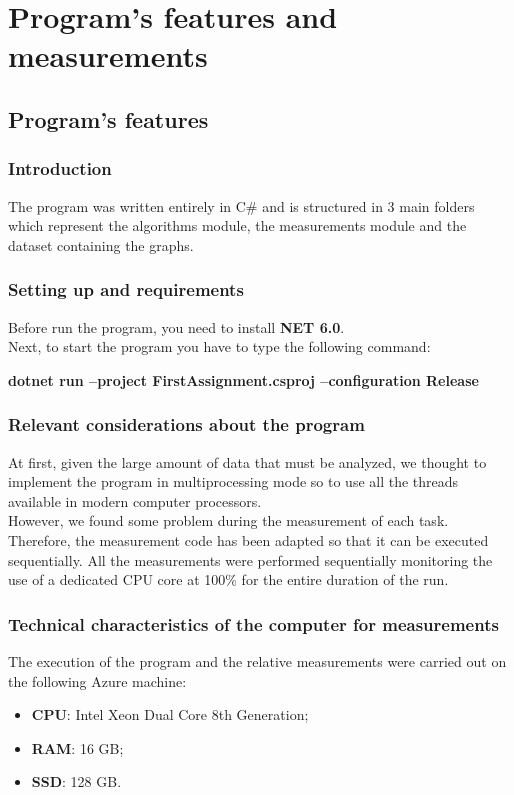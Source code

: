 \section{Program's features and measurements}

\subsection{Program's features}

\subsubsection{Introduction}
The program was written entirely in C\# and is structured in 3 main folders which represent the algorithms module, the measurements module and the dataset containing the graphs.

\subsubsection{Setting up and requirements}
Before run the program, you need to install \textbf{NET 6.0}.\\
Next, to start the program you have to type the following command:\\
\centerline{\textbf{dotnet run --project FirstAssignment.csproj --configuration Release}}

\subsubsection{Relevant considerations about the program}
At first, given the large amount of data that must be analyzed, we thought to implement the program in multiprocessing mode so to use all the threads available in modern computer processors. \\
\noindent
However, we found some problem during the measurement of each task.
Therefore, the measurement code has been adapted so that it can be executed sequentially.
All the measurements were performed sequentially monitoring the use of a dedicated CPU core at 100\% for the entire duration of the run.

\subsubsection{Technical characteristics of the computer for measurements}
The execution of the program and the relative measurements were carried out on the following Azure machine:
\begin{itemize}
    \item \textbf{CPU}: Intel Xeon Dual Core 8th Generation;
    \item \textbf{RAM}: 16 GB;
    \item \textbf{SSD}: 128 GB.
\end{itemize}

